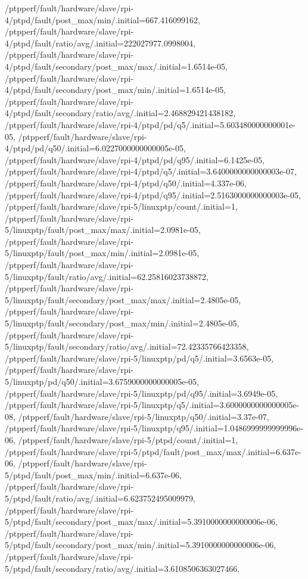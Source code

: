 {    /ptpperf/fault/hardware/slave/rpi-4/ptpd/fault/post_max/min/.initial=667.416099162,
    /ptpperf/fault/hardware/slave/rpi-4/ptpd/fault/ratio/avg/.initial=222027977.0998004,
    /ptpperf/fault/hardware/slave/rpi-4/ptpd/fault/secondary/post_max/max/.initial=1.6514e-05,
    /ptpperf/fault/hardware/slave/rpi-4/ptpd/fault/secondary/post_max/min/.initial=1.6514e-05,
    /ptpperf/fault/hardware/slave/rpi-4/ptpd/fault/secondary/ratio/avg/.initial=2.468829421438182,
    /ptpperf/fault/hardware/slave/rpi-4/ptpd/pd/q5/.initial=5.603480000000001e-05,
    /ptpperf/fault/hardware/slave/rpi-4/ptpd/pd/q50/.initial=6.0227000000000005e-05,
    /ptpperf/fault/hardware/slave/rpi-4/ptpd/pd/q95/.initial=6.1425e-05,
    /ptpperf/fault/hardware/slave/rpi-4/ptpd/q5/.initial=3.6400000000000003e-07,
    /ptpperf/fault/hardware/slave/rpi-4/ptpd/q50/.initial=4.337e-06,
    /ptpperf/fault/hardware/slave/rpi-4/ptpd/q95/.initial=2.5163000000000003e-05,
    /ptpperf/fault/hardware/slave/rpi-5/linuxptp/count/.initial=1,
    /ptpperf/fault/hardware/slave/rpi-5/linuxptp/fault/post_max/max/.initial=2.0981e-05,
    /ptpperf/fault/hardware/slave/rpi-5/linuxptp/fault/post_max/min/.initial=2.0981e-05,
    /ptpperf/fault/hardware/slave/rpi-5/linuxptp/fault/ratio/avg/.initial=62.25816023738872,
    /ptpperf/fault/hardware/slave/rpi-5/linuxptp/fault/secondary/post_max/max/.initial=2.4805e-05,
    /ptpperf/fault/hardware/slave/rpi-5/linuxptp/fault/secondary/post_max/min/.initial=2.4805e-05,
    /ptpperf/fault/hardware/slave/rpi-5/linuxptp/fault/secondary/ratio/avg/.initial=72.42335766423358,
    /ptpperf/fault/hardware/slave/rpi-5/linuxptp/pd/q5/.initial=3.6563e-05,
    /ptpperf/fault/hardware/slave/rpi-5/linuxptp/pd/q50/.initial=3.6759000000000005e-05,
    /ptpperf/fault/hardware/slave/rpi-5/linuxptp/pd/q95/.initial=3.6949e-05,
    /ptpperf/fault/hardware/slave/rpi-5/linuxptp/q5/.initial=3.6000000000000005e-08,
    /ptpperf/fault/hardware/slave/rpi-5/linuxptp/q50/.initial=3.37e-07,
    /ptpperf/fault/hardware/slave/rpi-5/linuxptp/q95/.initial=1.0486999999999996e-06,
    /ptpperf/fault/hardware/slave/rpi-5/ptpd/count/.initial=1,
    /ptpperf/fault/hardware/slave/rpi-5/ptpd/fault/post_max/max/.initial=6.637e-06,
    /ptpperf/fault/hardware/slave/rpi-5/ptpd/fault/post_max/min/.initial=6.637e-06,
    /ptpperf/fault/hardware/slave/rpi-5/ptpd/fault/ratio/avg/.initial=6.623752495009979,
    /ptpperf/fault/hardware/slave/rpi-5/ptpd/fault/secondary/post_max/max/.initial=5.3910000000000006e-06,
    /ptpperf/fault/hardware/slave/rpi-5/ptpd/fault/secondary/post_max/min/.initial=5.3910000000000006e-06,
    /ptpperf/fault/hardware/slave/rpi-5/ptpd/fault/secondary/ratio/avg/.initial=3.6108506363027466,
}
